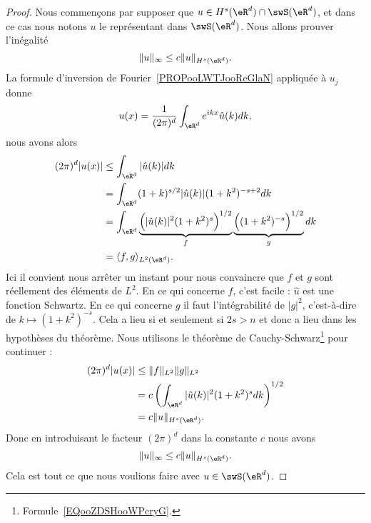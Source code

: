 \begin{proof}
	Nous commençons par supposer que \( u\in H^s(\eR^d)\cap \swS(\eR^d)\), et dans ce cas nous notons \( u\) le représentant dans \( \swS(\eR^d)\). Nous allons prouver l'inégalité
	\begin{equation}
		\| u \|_{\infty}\leq c\| u \|_{H^s(\eR^d)}.
	\end{equation}
	La formule d'inversion de Fourier~\ref{PROPooLWTJooReGlaN} appliquée à \( u_j\) donne
	\begin{equation}        \label{EQooDKYDooAxThqf}
		u(x)=\frac{1}{ (2\pi)^d }\int_{\eR^d} e^{ikx}\hat u(k)dk,
	\end{equation}
	nous avons alors
	\begin{subequations}
		\begin{align}
			(2\pi)^d| u(x) | & \leq\int_{\eR^d}| \hat u(k) |dk                                                                                           \\
			                 & =\int_{\eR^d}(1+k)^{s/2}| \hat u(k) |(1+k^2)^{-s+2}dk                                                                     \\
			                 & =\int_{\eR^d}\underbrace{\Big( | \hat u(k) |^2(1+k^2)^s \Big)^{1/2}}_{f}\underbrace{\Big( (1+k^2)^{-s} \Big)^{1/2}}_{g}dk \\
			                 & =\langle f, g\rangle_{L^2(\eR^d)}.
		\end{align}
	\end{subequations}
	Ici il convient nous arrêter un instant pour nous convaincre que \( f\) et \( g\) sont réellement des éléments de \( L^2\). En ce qui concerne \( f\), c'est facile : \( \hat u\) est une fonction Schwartz. En ce qui concerne \( g\) il faut l'intégrabilité de \( | g |^2\), c'est-à-dire de \( k\mapsto (1+k^2)^{-s}\). Cela a lieu si et seulement si \(2s>n\) et donc a lieu dans les hypothèses du théorème. Nous utilisons le théorème de Cauchy-Schwarz\footnote{Formule~\ref{EQooZDSHooWPcryG}.} pour continuer :
	\begin{subequations}
		\begin{align}
			(2\pi)^d| u(x) | & \leq \| f \|_{L^2}\| g \|_{L^2}                               \\
			                 & =c\left( \int_{\eR^d}| \hat u(k) |^2(1+k^2)^sdk \right)^{1/2} \\
			                 & =c\| u \|_{H^s(\eR^d)}.
		\end{align}
	\end{subequations}
	Donc en introduisant le facteur \( (2\pi)^d\) dans la constante \( c\) nous avons
	\begin{equation}
		\| u \|_{\infty}\leq c\| u \|_{H^s(\eR^d)}.
	\end{equation}
	Cela est tout ce que nous voulions faire avec \( u\in \swS(\eR^d)\).


\end{proof}
